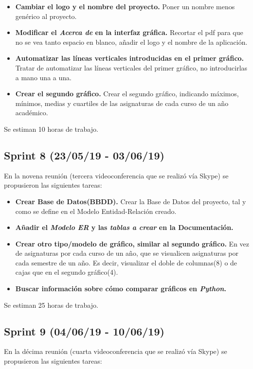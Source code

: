 \begin{itemize}
\item
\textbf{Cambiar el logo y el nombre del proyecto.} Poner un nombre menos genérico al proyecto.
\item
\textbf{Modificar el \emph{Acerca de} en la interfaz gráfica.} Recortar el pdf para que no se vea tanto espacio en blanco, añadir el logo y el nombre de la aplicación.
\item
\textbf{Automatizar las líneas verticales introducidas en el primer gráfico.} Tratar de automatizar las líneas verticales del primer gráfico, no introducirlas a mano una a una.
\item
\textbf{Crear el segundo gráfico.} Crear el segundo gráfico, indicando máximos, mínimos, medias y cuartiles de las asignaturas de cada curso de un año académico.
\end{itemize}

Se estiman 10 horas de trabajo.

\subsection{Sprint 8 (23/05/19 - 03/06/19)}
En la novena reunión (tercera videoconferencia que se realizó vía Skype) se propusieron las siguientes tareas:

\begin{itemize}
\item
\textbf{Crear Base de Datos(BBDD).} Crear la Base de Datos del proyecto, tal y como se define en el Modelo Entidad-Relación creado.
\item
\textbf{Añadir el \emph{Modelo ER} y las \emph{tablas a crear} en la Documentación.}
\item
\textbf{Crear otro tipo/modelo de gráfico, similar al segundo gráfico.} En vez de asignaturas por cada curso de un año, que se visualicen asignaturas por cada semestre de un año. Es decir, visualizar el doble de columnas(8) o de cajas que en el segundo gráfico(4).
\item
\textbf{Buscar información sobre cómo comparar gráficos en \emph{Python}.}
\end{itemize}

Se estiman 25 horas de trabajo.

\subsection{Sprint 9 (04/06/19 - 10/06/19)}
En la décima reunión (cuarta videoconferencia que se realizó vía Skype) se propusieron las siguientes tareas:

